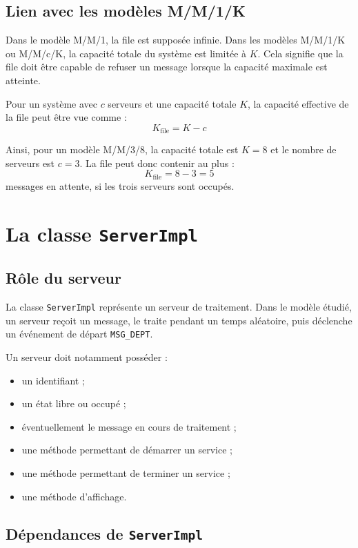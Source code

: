 \documentclass{article}
\begin{document}
\subsection{Lien avec les modèles M/M/1/K}

Dans le modèle M/M/1, la file est supposée infinie. Dans les modèles M/M/1/K ou M/M/c/K, la capacité totale du système est limitée à \(K\). Cela signifie que la file doit être capable de refuser un message lorsque la capacité maximale est atteinte.

Pour un système avec \(c\) serveurs et une capacité totale \(K\), la capacité effective de la file peut être vue comme :
\[
K_{\text{file}} = K - c
\]

Ainsi, pour un modèle M/M/3/8, la capacité totale est \(K=8\) et le nombre de serveurs est \(c=3\). La file peut donc contenir au plus :
\[
K_{\text{file}} = 8 - 3 = 5
\]
messages en attente, si les trois serveurs sont occupés.

\section{La classe \texttt{ServerImpl}}

\subsection{Rôle du serveur}

La classe \texttt{ServerImpl} représente un serveur de traitement. Dans le modèle étudié, un serveur reçoit un message, le traite pendant un temps aléatoire, puis déclenche un événement de départ \texttt{MSG\_DEPT}.

Un serveur doit notamment posséder :
\begin{itemize}[leftmargin=*]
    \item un identifiant ;
    \item un état libre ou occupé ;
    \item éventuellement le message en cours de traitement ;
    \item une méthode permettant de démarrer un service ;
    \item une méthode permettant de terminer un service ;
    \item une méthode d’affichage.
\end{itemize}

\subsection{Dépendances de \texttt{ServerImpl}}
\end{document}
